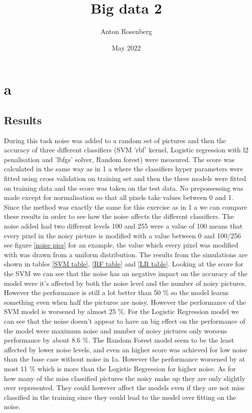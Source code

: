 \documentclass{article}
\title{Big data 2}
\author{Anton Rosenberg}
\date{May 2022}
\begin{document}
\maketitle
\newpage
\section{a}
\subsection{Results}
During this task noise was added to a random set of pictures and then the accuracy of three different classifiers (SVM 'rbf' kernel, Logistic regression with l2 penalisation and 'lbfgs' solver, Random forest) were measured. The score was calculated in the same way as in 1 a where the classifiers hyper parameters were fitted using cross validation on training set and then the three models were fitted on training data and the score was taken on the test data. No prepossessing was made except for normalisation so that all pixels take values between 0 and 1. Since the method was exactly the same for this exercise as in 1 a we can compare these results in order to see how the noise affects the different classifiers. The noise added had two different levels 100 and 255 were a value of 100 means that every pixel in the noisy picture is modified with a value between 0 and 100/256 see figure \ref{noise pics} for an example, the value which every pixel was modified with was drawn from a uniform distribution. The results from the simulations are shown in tables \ref{SVM table}, \ref{RF table} and \ref{LR table}. Looking at the score for the SVM we can see that the noise has an negative impact on the accuracy of the model were it's affected by both the noise level and the number of noisy pictures. However the performance is still a lot better than 50 \% so the model learns something even when half the pictures are noisy. However the performance of the SVM model is worsened by almost 25 \%. For the Logistic Regression model we can see that the noise doesn't appear to have an big effect on the performance of the model were maximum noise and number of noisy pictures only worsens performance by about 8.6 \%. The Random Forest model seem to be the least affected by lower noise levels, and even an higher score was achieved for low noise than the base case without noise in 1a. However the performance worsened by at most 11 \% which is more than the Logistic Regression for higher noise. As for how many of the miss classified pictures the noisy make up they are only slightly over represented. They could however affect the models even if they are not miss classified in the training since they could lead to the model over fitting on the noise.        
\end{document}
